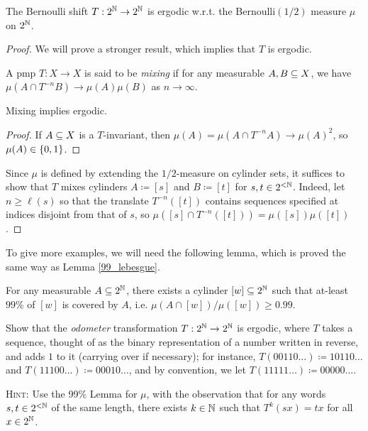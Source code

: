 \documentclass[reqno, twoside]{article}
\begin{document}
    \begin{proposition}\label{prp:shift_ergodic}
        The Bernoulli shift $T:2^{\mathbb{N}}\to2^{\mathbb{N}}$ is ergodic w.r.t. the Bernoulli$(1/2)$ measure $\mu$ on $2^{\mathbb{N}}$.
    \end{proposition}
    \begin{proof}
        We will prove a stronger result, which implies that $T$ is ergodic.
        \begin{center}
            \begin{minipage}{0.95\textwidth}
                \begin{definition}
                    A pmp $T:X\to X$ is said to be \textit{mixing} if for any measurable $A,B\subseteq X$, we have $\mu(A\cap T^{-n}B)\rightarrow\mu(A)\mu(B)$ as $n\to\infty$.
                \end{definition}
                \begin{lemma}
                    Mixing implies ergodic.
                \end{lemma}
                \begin{proof}
                    If $A\subseteq X$ is a $T$-invariant, then $\mu(A)=\mu(A\cap T^{-n}A)\to\mu(A)^2$, so $\mu(A)\in\left\{0,1\right\}$.\qedlem
                \end{proof}
            \end{minipage}
        \end{center}
        Since $\mu$ is defined by extending the $1/2$-measure on cylinder sets, it suffices to show that $T$ mixes cylinders $A\coloneqq[s]$ and $B\coloneqq[t]$ for $s,t\in2^{<\mathbb{N}}$. Indeed, let $n\geq\ell(s)$ so that the translate $T^{-n}([t])$ contains sequences specified at indices disjoint from that of $s$, so $\mu([s]\cap T^{-n}([t]))=\mu([s])\mu([t])$.
    \end{proof}

    To give more examples, we will need the following lemma, which is proved the same way as Lemma \ref{99_lebesgue}.

    \begin{lemma}
        For any measurable $A\subseteq2^{\mathbb{N}}$, there exists a cylinder $[w]\subseteq2^{\mathbb{N}}$ such that at-least $99\%$ of $[w]$ is covered by $A$, i.e. $\mu(A\cap[w])/\mu([w])\geq0.99$.
    \end{lemma}

    \begin{exercise}
        Show that the \textit{odometer} transformation $T:2^{\mathbb{N}}\to2^{\mathbb{N}}$ is ergodic, where $T$ takes a sequence, thought of as the binary representation of a number written in reverse, and adds $1$ to it (carrying over if necessary); for instance, $T(00110\dots)\coloneqq10110\dots$ and $T(11100\dots)\coloneqq00010\dots$, and by convention, we let $T(11111\dots)\coloneqq00000\dots$.

        \textsc{Hint:} Use the 99\% Lemma for $\mu$, with the observation that for any words $s,t\in2^{<\mathbb{N}}$ of the same length, there exists $k\in\mathbb{N}$ such that $T^k(sx)=tx$ for all $x\in2^{\mathbb{N}}$.
    \end{exercise}
\end{document}
